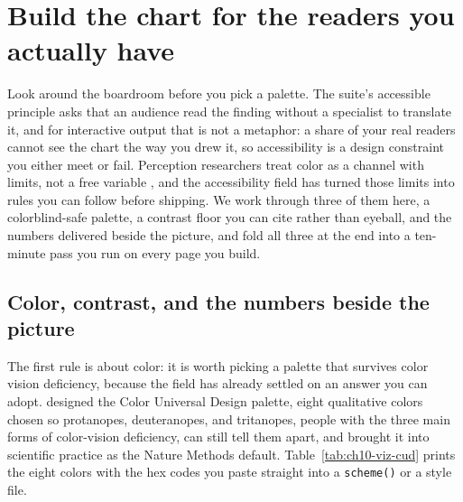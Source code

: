 \section{Build the chart for the readers you actually have}\label{ch10-sec:a11y}
Look around the boardroom before you pick a palette. The suite's accessible principle asks that an audience read the finding without a specialist to translate it, and for interactive output that is not a metaphor: a share of your real readers cannot see the chart the way you drew it, so accessibility is a design constraint you either meet or fail. Perception researchers treat color as a channel with limits, not a free variable \parencite{franconeri2021science}, and the accessibility field has turned those limits into rules you can follow before shipping. We work through three of them here, a colorblind-safe palette, a contrast floor you can cite rather than eyeball, and the numbers delivered beside the picture, and fold all three at the end into a ten-minute pass you run on every page you build.

\subsection{Color, contrast, and the numbers beside the picture}\label{ch10-sec:a11y-rules}
The first rule is about color: it is worth picking a palette that survives color vision deficiency, because the field has already settled on an answer you can adopt. \textcite{okabeito2008cud} designed the Color Universal Design palette, eight qualitative colors chosen so protanopes, deuteranopes, and tritanopes, people with the three main forms of color-vision deficiency, can still tell them apart, and \textcite{wong2011color} brought it into scientific practice as the Nature Methods default. Table~\ref{tab:ch10-viz-cud} prints the eight colors with the hex codes you paste straight into a \texttt{scheme()} or a style file.

